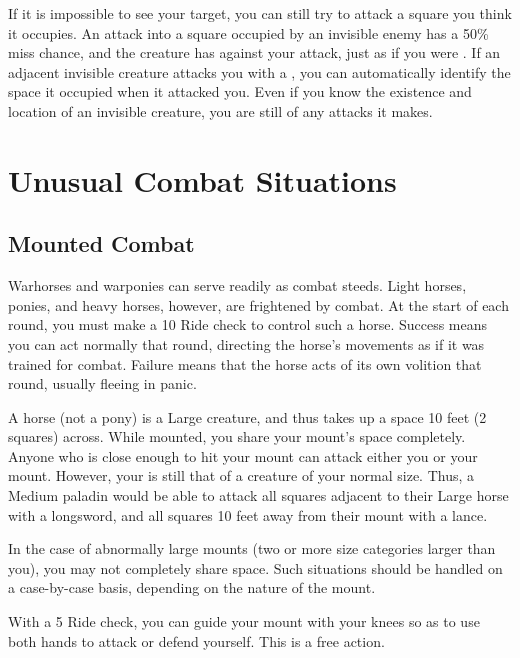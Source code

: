             If it is impossible to see your target, you can still try to attack a square you think it occupies.
            An attack into a square occupied by an invisible enemy has a 50\% miss chance, and the creature has  against your attack, just as if you were \blinded.
            If an adjacent invisible creature attacks you with a , you can automatically identify the space it occupied when it attacked you.
            Even if you know the existence and location of an invisible creature, you are still \partiallyunaware of any attacks it makes.

\section{Unusual Combat Situations}

    \subsection{Mounted Combat}\label{Mounted Combat}
         Warhorses and warponies can serve readily as combat steeds. Light horses, ponies, and heavy horses, however, are frightened by combat.
        At the start of each round, you must make a  10 Ride check to control such a horse.
        Success means you can act normally that round, directing the horse's movements as if it was trained for combat.
        Failure means that the horse acts of its own volition that round, usually fleeing in panic.

         A horse (not a pony) is a Large creature, and thus takes up a space 10 feet (2 squares) across. While mounted, you share your mount's space completely. Anyone who is close enough to hit your mount can attack either you or your mount. However, your  is still that of a creature of your normal size. Thus, a Medium paladin would be able to attack all squares adjacent to their Large horse with a longsword, and all squares 10 feet away from their mount with a lance.

        In the case of abnormally large mounts (two or more size categories larger than you), you may not completely share space. Such situations should be handled on a case-by-case basis, depending on the nature of the mount.

         With a  5 Ride check, you can guide your mount with your knees so as to use both hands to attack or defend yourself. This is a free action.

